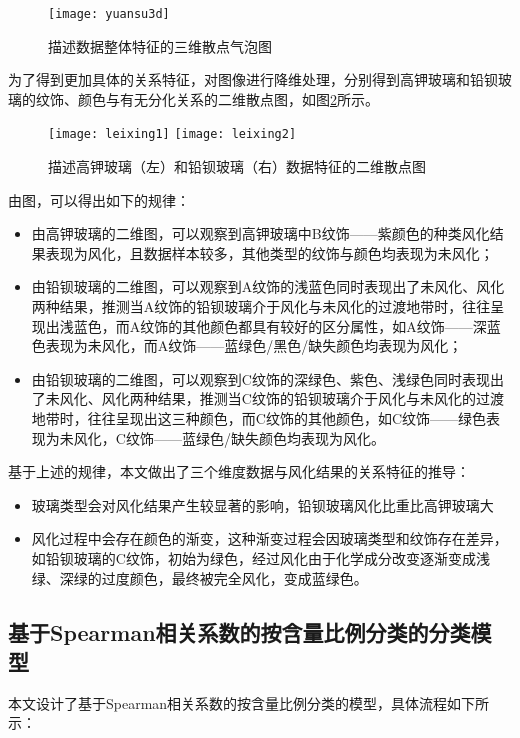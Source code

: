 \documentclass[withoutpreface,bwprint]{cumcmthesis} %
\begin{document}
\begin{figure}[!h]
	\centering
	\texttt{[image: yuansu3d]}
	\caption{描述数据整体特征的三维散点气泡图}
	\label{yuansu3d}
\end{figure}


为了得到更加具体的关系特征，对图像进行降维处理，分别得到高钾玻璃和铅钡玻璃的纹饰、颜色与有无分化关系的二维散点图，如图\ref{leixing}所示。

\begin{figure}[!h]
	\centering
	\texttt{[image: leixing1]}
	\texttt{[image: leixing2]}
	\caption{描述高钾玻璃（左）和铅钡玻璃（右）数据特征的二维散点图}
	\label{leixing}
\end{figure}


由图，可以得出如下的规律：
\begin{itemize}
	\item 由高钾玻璃的二维图，可以观察到高钾玻璃中B纹饰——紫颜色的种类风化结果表现为风化，且数据样本较多，其他类型的纹饰与颜色均表现为未风化；
	\item 由铅钡玻璃的二维图，可以观察到A纹饰的浅蓝色同时表现出了未风化、风化两种结果，推测当A纹饰的铅钡玻璃介于风化与未风化的过渡地带时，往往呈现出浅蓝色，而A纹饰的其他颜色都具有较好的区分属性，如A纹饰——深蓝色表现为未风化，而A纹饰——蓝绿色/黑色/缺失颜色均表现为风化；
	\item 由铅钡玻璃的二维图，可以观察到C纹饰的深绿色、紫色、浅绿色同时表现出了未风化、风化两种结果，推测当C纹饰的铅钡玻璃介于风化与未风化的过渡地带时，往往呈现出这三种颜色，而C纹饰的其他颜色，如C纹饰——绿色表现为未风化，C纹饰——蓝绿色/缺失颜色均表现为风化。
\end{itemize}


基于上述的规律，本文做出了三个维度数据与风化结果的关系特征的推导：
\begin{itemize}
	\item 玻璃类型会对风化结果产生较显著的影响，铅钡玻璃风化比重比高钾玻璃大
	\item 风化过程中会存在颜色的渐变，这种渐变过程会因玻璃类型和纹饰存在差异，如铅钡玻璃的C纹饰，初始为绿色，经过风化由于化学成分改变逐渐变成浅绿、深绿的过度颜色，最终被完全风化，变成蓝绿色。
\end{itemize}


\subsection{基于Spearman相关系数的按含量比例分类的分类模型}

本文设计了基于Spearman相关系数的按含量比例分类的模型，具体流程如下所示：
\end{document}
